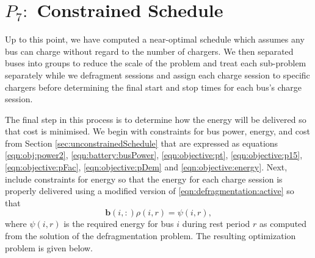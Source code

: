 \section{$P_7:$ Constrained Schedule\label{sec:constrainedSchedule}}
Up to this point, we have computed a near-optimal schedule which assumes any bus can charge without regard to the number of chargers. We then separated buses into groups to reduce the scale of the problem and treat each sub-problem separately while we defragment sessions and assign each charge session to specific chargers before determining the final start and stop times for each bus's charge session.
\par The final step in this process is to determine how the energy will be delivered so that cost is minimised. We begin with constraints for bus power, energy, and cost from Section \ref{sec:unconstrainedSchedule} that are expressed as equations \eqref{eqn:obj:power2}, \eqref{eqn:battery:busPower}, \eqref{eqn:objective:pt}, \eqref{eqn:objective:p15}, \eqref{eqn:objective:pFac}, \eqref{eqn:objective:pDem} and \eqref{eqn:objective:energy}. Next, include constraints for energy so that the energy for each charge session is properly delivered using a modified version of \eqref{eqn:defragmentation:active} so that
\begin{equation}\label{eqn:constrainedSchedule:modified}
	\mathbf{b}(i,:)\rho(i,r) = \psi(i,r),
\end{equation}
where $\psi(i,r)$ is the required energy for bus $i$ during rest period $r$ as computed from the solution of the defragmentation problem.  The resulting optimization problem is given below.\\[0.1in]

